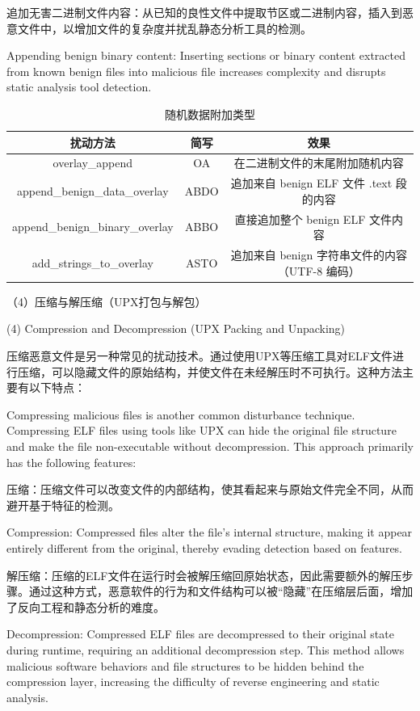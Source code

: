 追加无害二进制文件内容：从已知的良性文件中提取节区或二进制内容，插入到恶意文件中，以增加文件的复杂度并扰乱静态分析工具的检测。

Appending benign binary content: Inserting sections or binary content extracted from known benign files into malicious file increases complexity and disrupts static analysis tool detection.

\begin{table}[htbp]
	\centering
	\caption{随机数据附加类型}\label{tab:4.3}
	\begin{tabular*}{\textwidth}{@{\extracolsep{\fill}}ccc}
		\toprule
		扰动方法 & 简写 & 效果 \\
		\midrule
		overlay\_append & OA & 在二进制文件的末尾附加随机内容 \\
		append\_benign\_data\_overlay & ABDO & 追加来自 benign ELF 文件 .text 段的内容 \\
		append\_benign\_binary\_overlay & ABBO & 直接追加整个 benign ELF 文件内容 \\
		add\_strings\_to\_overlay & ASTO & 追加来自 benign 字符串文件的内容（UTF-8 编码） \\
		\bottomrule
	\end{tabular*}
\end{table}

（4）压缩与解压缩（UPX打包与解包）

(4) Compression and Decompression (UPX Packing and Unpacking)

压缩恶意文件是另一种常见的扰动技术。通过使用UPX等压缩工具对ELF文件进行压缩，可以隐藏文件的原始结构，并使文件在未经解压时不可执行。这种方法主要有以下特点：

Compressing malicious files is another common disturbance technique. Compressing ELF files using tools like UPX can hide the original file structure and make the file non-executable without decompression. This approach primarily has the following features:

压缩：压缩文件可以改变文件的内部结构，使其看起来与原始文件完全不同，从而避开基于特征的检测。

Compression: Compressed files alter the file's internal structure, making it appear entirely different from the original, thereby evading detection based on features.

解压缩：压缩的ELF文件在运行时会被解压缩回原始状态，因此需要额外的解压步骤。通过这种方式，恶意软件的行为和文件结构可以被“隐藏”在压缩层后面，增加了反向工程和静态分析的难度。

Decompression: Compressed ELF files are decompressed to their original state during runtime, requiring an additional decompression step. This method allows malicious software behaviors and file structures to be hidden behind the compression layer, increasing the difficulty of reverse engineering and static analysis.

